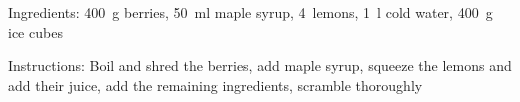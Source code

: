 
Ingredients:
400~g berries, 50~ml maple syrup, 4~lemons, 1~l cold water, 400~g ice cubes

\noindent Instructions: Boil and shred the berries, add maple syrup, squeeze the lemons and add their juice, add the remaining ingredients, scramble thoroughly